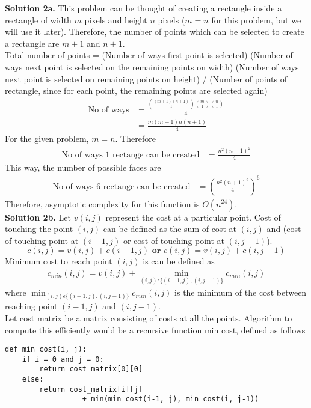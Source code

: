 \documentclass[11pt]{article}
\begin{document}
\textbf{Solution 2a.} This problem can be thought of creating a rectangle inside a rectangle of width $m$ pixels and height $n$ pixels ($m = n$ for this problem, but we will use it later). Therefore, the number of points which can be selected to create a rectangle are $m+1$ and $n+1$. \\
\linebreak
Total number of points  = (Number of ways first point is selected) (Number of ways next point is selected on the remaining points on width) (Number of ways next point is selected on remaining points on height) / (Number of points of rectangle, since for each point, the remaining points are selected again)
\begin{align*}
\text{No of ways} &= \frac{{(m+1)(n+1)\choose 1} {m\choose 1}{n\choose 1}}{4} \\
&= \frac{m(m+1)n(n+1)}{4}
\end{align*}
For the given problem, $m = n$. Therefore
\begin{align*}
\text{No of ways 1 rectange can be created} &= \frac{n^2(n+1)^2}{4}
\end{align*}
This way, the number of possible faces are \\
\begin{align*}
\text{No of ways 6 rectange can be created} &= (\frac{n^2(n+1)^2}{4})^6
\end{align*}
Therefore, asymptotic complexity for this function is $O(n^{24})$. \\
\linebreak
\textbf{Solution 2b.} Let $v(i, j)$ represent the cost at a particular point. Cost of touching the point $(i, j)$ can be defined as the sum of cost at $(i, j)$ and (cost of touching point at $(i-1, j)$ or cost of touching point at $(i, j-1)$). $$c(i, j) = v(i, j) + c(i-1, j) \textbf{ or } c(i, j) = v(i,j) + c(i, j-1)$$
Minimum cost to reach point $(i, j)$ is can be defined as \\
\begin{align*}
c_{min}(i, j) = v(i, j) + \min_{(i, j) \epsilon \{(i-1, j), (i, j-1)\}}c_{min}(i, j)
\end{align*}
where $\min_{(i, j) \epsilon \{(i-1, j), (i, j-1)\}}c_{min}(i, j)$ is the minimum of the cost between reaching point $(i-1, j)$ and $(i, j-1)$. \\
Let cost matrix be a matrix consisting of costs at all the points. Algorithm to compute this efficiently would be a recursive function min cost, defined as follows\\
\begin{lstlisting}
def min_cost(i, j):
	if i = 0 and j = 0:
		return cost_matrix[0][0]
	else:
		return cost_matrix[i][j] 
				  + min(min_cost(i-1, j), min_cost(i, j-1))
\end{lstlisting}
\end{document}
